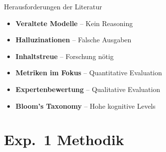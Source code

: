 \documentclass[usenames, dvipsnames, aspectratio=32]{beamer}
\begin{document}
\begin{frame}{Herausforderungen der Literatur}
    \begin{itemize}
        \item \textbf{Veraltete Modelle} -- Kein Reasoning
        \item \textbf{Halluzinationen} -- Falsche Ausgaben
        \item \textbf{Inhaltstreue} -- Forschung nötig
        \item \textbf{Metriken im Fokus} -- Quantitative Evaluation
        \item \textbf{Expertenbewertung} -- Qualitative Evaluation 
        \item \textbf{Bloom's Taxonomy} -- Hohe kognitive Levels

    \end{itemize}
\end{frame}

\section{Exp.\ 1 Methodik}
\end{document}
